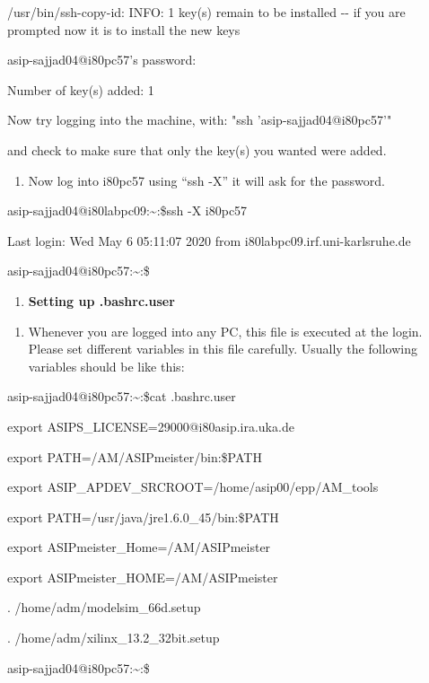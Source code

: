 \documentclass[
]{article}
\begin{document}
/usr/bin/ssh-copy-id: INFO: 1 key(s) remain to be installed -\/- if you
are prompted now it is to install the new keys

asip-sajjad04@i80pc57's password:

Number of key(s) added: 1

Now try logging into the machine, with: "ssh 'asip-sajjad04@i80pc57'"

and check to make sure that only the key(s) you wanted were added.

\begin{enumerate}
\def\labelenumi{\arabic{enumi}.}
\setcounter{enumi}{11}
\item
  Now log into i80pc57 using ``ssh -X'' it will ask for the password.
\end{enumerate}

asip-sajjad04@i80labpc09:\textasciitilde:\$ssh -X i80pc57

Last login: Wed May 6 05:11:07 2020 from i80labpc09.irf.uni-karlsruhe.de

asip-sajjad04@i80pc57:\textasciitilde:\$

\begin{enumerate}
\def\labelenumi{\Alph{enumi}.}
\setcounter{enumi}{3}
\item
  \textbf{Setting up .bashrc.user}
\end{enumerate}

\begin{enumerate}
\def\labelenumi{\arabic{enumi}.}
\setcounter{enumi}{12}
\item
  Whenever you are logged into any PC, this file is executed at the
  login. Please set different variables in this file carefully. Usually
  the following variables should be like this:
\end{enumerate}

asip-sajjad04@i80pc57:\textasciitilde:\$cat .bashrc.user

export ASIPS\_LICENSE=29000@i80asip.ira.uka.de

export PATH=/AM/ASIPmeister/bin:\$PATH

export ASIP\_APDEV\_SRCROOT=/home/asip00/epp/AM\_tools

export PATH=/usr/java/jre1.6.0\_45/bin:\$PATH

export ASIPmeister\_Home=/AM/ASIPmeister

export ASIPmeister\_HOME=/AM/ASIPmeister

. /home/adm/modelsim\_66d.setup

. /home/adm/xilinx\_13.2\_32bit.setup

asip-sajjad04@i80pc57:\textasciitilde:\$
\end{document}
